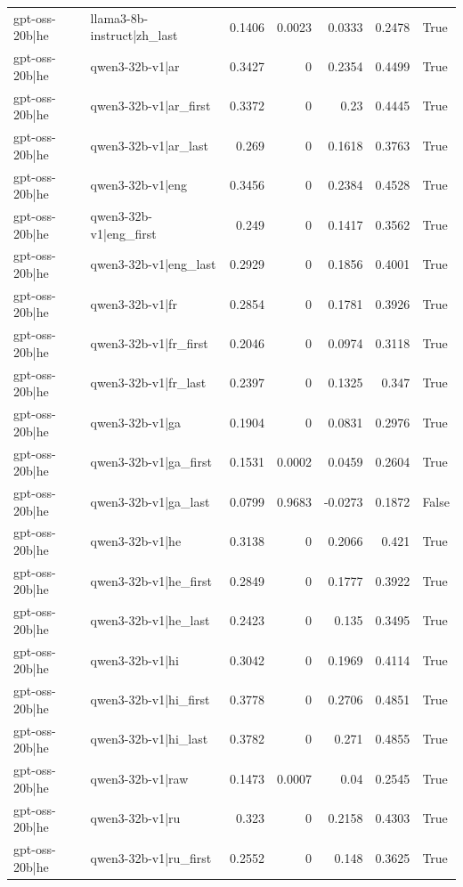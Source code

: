 \begin{table}
\begin{tabular}{l l r r r r l}
gpt-oss-20b|he & llama3-8b-instruct|zh_last & 0.1406 & 0.0023 & 0.0333 & 0.2478 & True \\
gpt-oss-20b|he & qwen3-32b-v1|ar & 0.3427 & 0 & 0.2354 & 0.4499 & True \\
gpt-oss-20b|he & qwen3-32b-v1|ar_first & 0.3372 & 0 & 0.23 & 0.4445 & True \\
gpt-oss-20b|he & qwen3-32b-v1|ar_last & 0.269 & 0 & 0.1618 & 0.3763 & True \\
gpt-oss-20b|he & qwen3-32b-v1|eng & 0.3456 & 0 & 0.2384 & 0.4528 & True \\
gpt-oss-20b|he & qwen3-32b-v1|eng_first & 0.249 & 0 & 0.1417 & 0.3562 & True \\
gpt-oss-20b|he & qwen3-32b-v1|eng_last & 0.2929 & 0 & 0.1856 & 0.4001 & True \\
gpt-oss-20b|he & qwen3-32b-v1|fr & 0.2854 & 0 & 0.1781 & 0.3926 & True \\
gpt-oss-20b|he & qwen3-32b-v1|fr_first & 0.2046 & 0 & 0.0974 & 0.3118 & True \\
gpt-oss-20b|he & qwen3-32b-v1|fr_last & 0.2397 & 0 & 0.1325 & 0.347 & True \\
gpt-oss-20b|he & qwen3-32b-v1|ga & 0.1904 & 0 & 0.0831 & 0.2976 & True \\
gpt-oss-20b|he & qwen3-32b-v1|ga_first & 0.1531 & 0.0002 & 0.0459 & 0.2604 & True \\
gpt-oss-20b|he & qwen3-32b-v1|ga_last & 0.0799 & 0.9683 & -0.0273 & 0.1872 & False \\
gpt-oss-20b|he & qwen3-32b-v1|he & 0.3138 & 0 & 0.2066 & 0.421 & True \\
gpt-oss-20b|he & qwen3-32b-v1|he_first & 0.2849 & 0 & 0.1777 & 0.3922 & True \\
gpt-oss-20b|he & qwen3-32b-v1|he_last & 0.2423 & 0 & 0.135 & 0.3495 & True \\
gpt-oss-20b|he & qwen3-32b-v1|hi & 0.3042 & 0 & 0.1969 & 0.4114 & True \\
gpt-oss-20b|he & qwen3-32b-v1|hi_first & 0.3778 & 0 & 0.2706 & 0.4851 & True \\
gpt-oss-20b|he & qwen3-32b-v1|hi_last & 0.3782 & 0 & 0.271 & 0.4855 & True \\
gpt-oss-20b|he & qwen3-32b-v1|raw & 0.1473 & 0.0007 & 0.04 & 0.2545 & True \\
gpt-oss-20b|he & qwen3-32b-v1|ru & 0.323 & 0 & 0.2158 & 0.4303 & True \\
gpt-oss-20b|he & qwen3-32b-v1|ru_first & 0.2552 & 0 & 0.148 & 0.3625 & True \\

\end{tabular}
\end{table}
